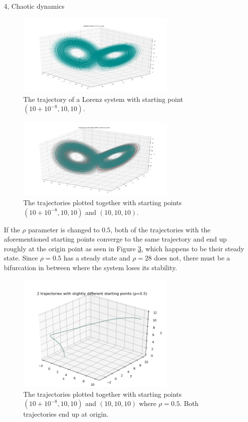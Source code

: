 \documentclass[10pt,a4paper]{article}
\begin{document}
\begin{task}{4, Chaotic dynamics}
\begin{figure}[H]
    \centering
    \includegraphics[width=0.7\textwidth]{../plots/lorenz_2.png}
    \caption{The trajectory of a Lorenz system with starting point $(10+10^{-8}, 10, 10)$.}
    \label{fig:lorenz_2}
\end{figure}

\begin{figure}[H]
    \centering
    \includegraphics[width=0.7\textwidth]{../plots/lorenz_3.png}
    \caption{The trajectories plotted together with starting points $(10+10^{-8}, 10, 10)$ and $(10, 10, 10)$.}
    \label{fig:lorenz_3}
\end{figure}

If the $\rho$ parameter is changed to $0.5$, both of the trajectories with the aforementioned starting points converge to the same trajectory and end up roughly at the origin point as seen in Figure \ref{fig:lorenz_4}, which happens to be their steady state. Since $\rho=0.5$ has a steady state and $\rho=28$ does not, there must be a bifurcation in between where the system loses its stability. \\

\begin{figure}[H]
    \centering
    \includegraphics[width=0.7\textwidth]{../plots/lorenz_4.png}
    \caption{The trajectories plotted together with starting points $(10+10^{-8}, 10, 10)$ and $(10, 10, 10)$ where $\rho=0.5$. Both trajectories end up at origin.}
    \label{fig:lorenz_4}
\end{figure}

\end{task}
\end{document}
